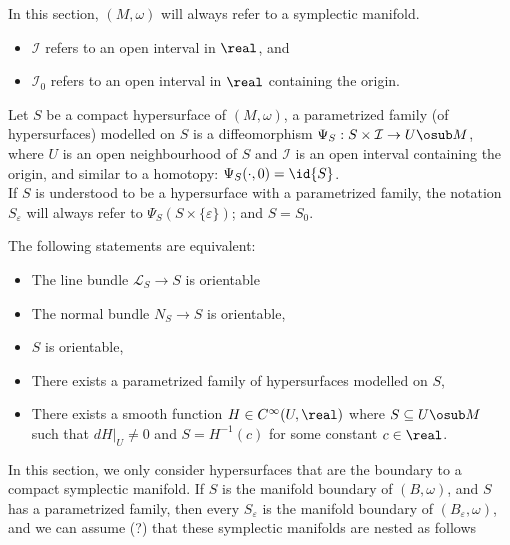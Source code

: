 \documentclass[../main-v2-manifolds.tex]{subfiles}
\begin{document}
%
%

%
%
%
%
In this section, $(M,\omega)$ will always refer to a symplectic manifold.
\begin{remark}
    \begin{itemize}
        \item $\mathcal{I}$ refers to an open interval in $\real$, and
        \item $\mathcal{I}_0$ refers to an open interval in $\real$ containing the origin.
    \end{itemize}
\end{remark}
\begin{definition}
    Let $S$ be a compact hypersurface of $(M,\omega)$, a parametrized family (of hypersurfaces) modelled on $S$ is a diffeomorphism $\Psi_S: S\times \mathcal{I}\to U\osub M$, where $U$ is an open neighbourhood of $S$ and $\mathcal{I}$ is an open interval containing the origin, and similar to a homotopy: $\Psi_S(\cdot,0) = \id{S}$.\\

    If $S$ is understood to be a hypersurface with a parametrized family, the notation $S_{\varepsilon}$ will always refer to  $\Psi_S(S\times\{\varepsilon\})$; and $S = S_0$.
\end{definition}
\begin{wts}[page 114]
    The following statements are equivalent:
    \begin{itemize}
        \item The line bundle $\mathcal{L}_S\to S$ is orientable
        \item The normal bundle $N_S\to S$ is orientable,
        \item $S$ is orientable,
        \item There exists a parametrized family of hypersurfaces modelled on $S$,
        \item There exists a smooth function $H\in C^\infty(U,\real)$ where $S\subseteq U\osub M$ such that $dH\vert_U\neq 0$ and $S = H^{-1}(c)$ for some constant $c\in\real$.
    \end{itemize}
\end{wts}   
In this section, we only consider hypersurfaces that are the boundary to a compact symplectic manifold. If $S$ is the manifold boundary of $(B,\omega)$, and $S$ has a parametrized family, then every $S_{\varepsilon}$ is the manifold boundary of $(B_\varepsilon,\omega)$, and we can assume (?) that these symplectic manifolds are nested as follows
\end{document}
